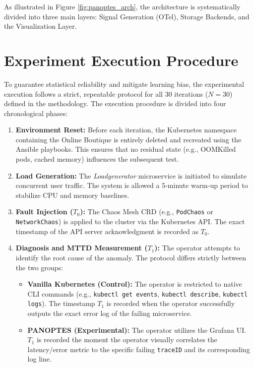 As illustrated in Figure \ref{fig:panoptes_arch}, the architecture is systematically divided into three main layers: Signal Generation (OTel), Storage Backends, and the Visualization Layer.











\section{Experiment Execution Procedure}
\label{sec:execution-procedure}

To guarantee statistical reliability and mitigate learning bias, the experimental execution follows a strict, repeatable protocol for all 30 iterations ($N=30$) defined in the methodology. The execution procedure is divided into four chronological phases:

\begin{enumerate}
    \item \textbf{Environment Reset:} Before each iteration, the Kubernetes namespace containing the Online Boutique is entirely deleted and recreated using the Ansible playbooks. This ensures that no residual state (e.g., OOMKilled pods, cached memory) influences the subsequent test.
    \item \textbf{Load Generation:} The \textit{Loadgenerator} microservice is initiated to simulate concurrent user traffic. The system is allowed a 5-minute warm-up period to stabilize CPU and memory baselines.
    \item \textbf{Fault Injection ($T_0$):} The Chaos Mesh CRD (e.g., \texttt{PodChaos} or \texttt{NetworkChaos}) is applied to the cluster via the Kubernetes API. The exact timestamp of the API server acknowledgment is recorded as $T_0$.
    \item \textbf{Diagnosis and MTTD Measurement ($T_1$):} The operator attempts to identify the root cause of the anomaly. The protocol differs strictly between the two groups:
    \begin{itemize}
        \item \textbf{Vanilla Kubernetes (Control):} The operator is restricted to native CLI commands (e.g., \texttt{kubectl get events}, \texttt{kubectl describe}, \texttt{kubectl logs}). The timestamp $T_1$ is recorded when the operator successfully outputs the exact error log of the failing microservice.
        \item \textbf{PANOPTES (Experimental):} The operator utilizes the Grafana UI. $T_1$ is recorded the moment the operator visually correlates the latency/error metric to the specific failing \texttt{traceID} and its corresponding log line.
    \end{itemize}
\end{enumerate}

